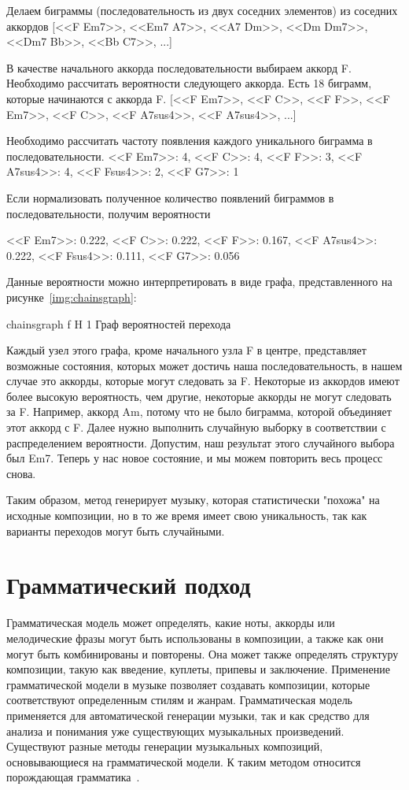 Делаем биграммы (последовательность из двух соседних элементов) из соседних аккордов
[<<F Em7>>, <<Em7 A7>>, <<A7 Dm>>, <<Dm Dm7>>, <<Dm7 Bb>>, <<Bb C7>>, ...]

В качестве начального аккорда последовательности выбираем аккорд F. Необходимо рассчитать вероятности следующего аккорда. Есть 18 биграмм, которые начинаются с аккорда F.
[<<F Em7>>, <<F C>>, <<F F>>, <<F Em7>>, <<F C>>, <<F A7sus4>>, <<F A7sus4>>, ...]

Необходимо рассчитать частоту появления каждого уникального биграмма в последовательности.
{<<F Em7>>: 4, <<F C>>: 4, <<F F>>: 3, <<F A7sus4>>: 4, <<F Fsus4>>: 2, <<F G7>>: 1}

Если нормализовать полученное количество появлений биграммов в последовательности, получим вероятности

{<<F Em7>>: 0.222,  <<F C>>: 0.222,  <<F F>>: 0.167,  <<F A7sus4>>: 0.222,  <<F Fsus4>>: 0.111, <<F G7>>: 0.056}

Данные вероятности можно интерпретировать в виде графа, представленного на рисунке~\ref{img:chainsgraph}:

{chainsgraph}
{f}
{H}
{1\textwidth}
{Граф вероятностей перехода}

Каждый узел этого графа, кроме начального узла F в центре, представляет возможные состояния, которых может достичь наша последовательность, в нашем случае это аккорды, которые могут следовать за F. 
Некоторые из аккордов имеют более высокую вероятность, чем другие, некоторые аккорды не могут следовать за F. Например, аккорд Am, потому что не было биграмма, которой объединяет этот аккорд с F. 
Далее нужно выполнить случайную выборку в соответствии с распределением вероятности. Допустим, наш результат этого случайного выбора был Em7. 
Теперь у нас новое состояние, и мы можем повторить весь процесс снова.

Таким образом, метод генерирует музыку, которая статистически "похожа" на исходные композиции, но в то же время имеет свою уникальность, так как варианты переходов могут быть случайными.


\section{Грамматический подход}

Грамматическая модель может определять, какие ноты, аккорды или мелодические фразы могут быть использованы в композиции, а также как они могут быть комбинированы и повторены. Она может также определять структуру композиции, такую как введение, куплеты, припевы и заключение. Применение грамматической модели в музыке позволяет создавать композиции, которые соответствуют определенным стилям и жанрам. Грамматическая модель применяется для автоматической генерации музыки, так и как средство для анализа и понимания уже существующих музыкальных произведений. Существуют разные методы генерации музыкальных композиций, основывающиеся на грамматической модели. К таким методом относится порождающая грамматика~\cite{haskell}.

